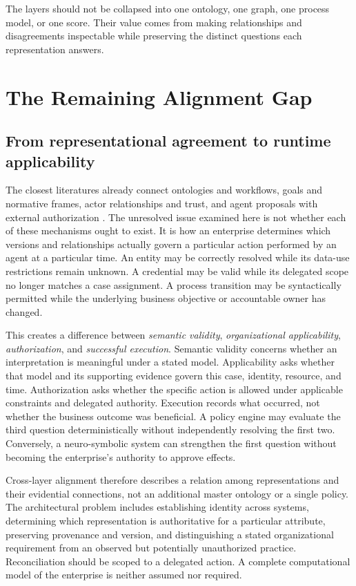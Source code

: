 \documentclass[11pt,letterpaper]{article}
\newcommand{\parencite}[1]{\citep{#1}}
\begin{document}
The layers should not be collapsed into one ontology, one graph, one process model, or one score. Their value comes from making relationships and disagreements inspectable while preserving the distinct questions each representation answers.



\section{The Remaining Alignment Gap}
\subsection{From representational agreement to runtime applicability}
The closest literatures already connect ontologies and workflows, goals and normative frames, actor relationships and trust, and agent proposals with external authorization \parencite{calvanese2026manifesto,jorgensen2026governing}. The unresolved issue examined here is not whether each of these mechanisms ought to exist. It is how an enterprise determines which versions and relationships actually govern a particular action performed by an agent at a particular time. An entity may be correctly resolved while its data-use restrictions remain unknown. A credential may be valid while its delegated scope no longer matches a case assignment. A process transition may be syntactically permitted while the underlying business objective or accountable owner has changed.

This creates a difference between \emph{semantic validity}, \emph{organizational applicability}, \emph{authorization}, and \emph{successful execution}. Semantic validity concerns whether an interpretation is meaningful under a stated model. Applicability asks whether that model and its supporting evidence govern this case, identity, resource, and time. Authorization asks whether the specific action is allowed under applicable constraints and delegated authority. Execution records what occurred, not whether the business outcome was beneficial. A policy engine may evaluate the third question deterministically without independently resolving the first two. Conversely, a neuro-symbolic system can strengthen the first question without becoming the enterprise's authority to approve effects.

Cross-layer alignment therefore describes a relation among representations and their evidential connections, not an additional master ontology or a single policy. The architectural problem includes establishing identity across systems, determining which representation is authoritative for a particular attribute, preserving provenance and version, and distinguishing a stated organizational requirement from an observed but potentially unauthorized practice. Reconciliation should be scoped to a delegated action. A complete computational model of the enterprise is neither assumed nor required.
\end{document}
